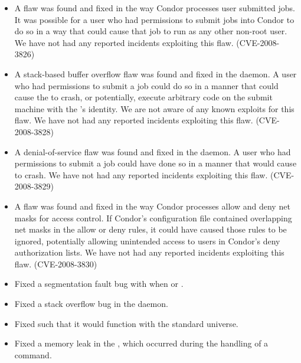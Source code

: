 \begin{itemize}

\item \Security A flaw was found and fixed in the way Condor processes user submitted
jobs. It was possible for a user who had permissions to submit jobs into
Condor to do so in a way that could cause that job to run as any other
non-root user. We have not had any reported incidents exploiting this
flaw. (CVE-2008-3826)

\item \Security A stack-based buffer overflow flaw was found and fixed in the
 daemon. A user who had permissions to submit a job could
do so in a manner that could cause the  to crash, or
potentially, execute arbitrary code on the submit machine with the
's identity. We are not aware of any known exploits for
this flaw. We have not had any reported incidents exploiting this flaw.
(CVE-2008-3828)

\item \Security A denial-of-service flaw was found and fixed in the 
daemon. A user who had permissions to submit a job could have done so in a
manner that would cause  to crash. 
We have not had any reported incidents exploiting this flaw. (CVE-2008-3829)

\item \Security A flaw was found and fixed in the way Condor processes allow and deny 
net masks for access control. 
If Condor's configuration file contained overlapping net masks in 
the allow or deny rules, it could have caused those rules to be ignored, 
potentially allowing unintended access to users in Condor's 
deny authorization lists. 
We have not had any reported incidents exploiting this flaw. (CVE-2008-3830) 

\item Fixed a segmentation fault bug with   when
 or .

\item Fixed a stack overflow bug in the  daemon.

\item Fixed   such that it would function with the
standard universe.

\item Fixed a memory leak in the , which occurred during the
handling of a  command.


\end{itemize}
